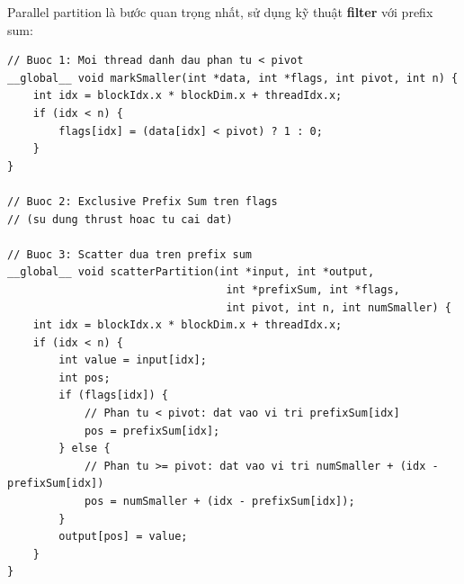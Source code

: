 Parallel partition là bước quan trọng nhất, sử dụng kỹ thuật \textbf{filter} với prefix sum:

\begin{lstlisting}[caption={Parallel Partition với Prefix Sum}, label={lst:parallel_partition}]
// Buoc 1: Moi thread danh dau phan tu < pivot
__global__ void markSmaller(int *data, int *flags, int pivot, int n) {
    int idx = blockIdx.x * blockDim.x + threadIdx.x;
    if (idx < n) {
        flags[idx] = (data[idx] < pivot) ? 1 : 0;
    }
}

// Buoc 2: Exclusive Prefix Sum tren flags
// (su dung thrust hoac tu cai dat)

// Buoc 3: Scatter dua tren prefix sum
__global__ void scatterPartition(int *input, int *output, 
                                  int *prefixSum, int *flags, 
                                  int pivot, int n, int numSmaller) {
    int idx = blockIdx.x * blockDim.x + threadIdx.x;
    if (idx < n) {
        int value = input[idx];
        int pos;
        if (flags[idx]) {
            // Phan tu < pivot: dat vao vi tri prefixSum[idx]
            pos = prefixSum[idx];
        } else {
            // Phan tu >= pivot: dat vao vi tri numSmaller + (idx - prefixSum[idx])
            pos = numSmaller + (idx - prefixSum[idx]);
        }
        output[pos] = value;
    }
}
\end{lstlisting}

